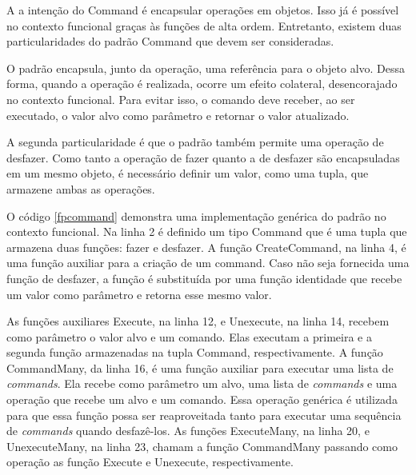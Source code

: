 A a intenção do Command é encapsular operações 
em objetos. Isso já é possível no contexto 
funcional graças às funções de alta ordem. 
Entretanto, existem duas particularidades 
do padrão Command que devem ser consideradas. 

O padrão encapsula, junto da operação, uma 
referência para o objeto alvo. Dessa forma, 
quando a operação é realizada, ocorre 
um efeito colateral, desencorajado 
no contexto funcional. Para evitar isso, o 
comando deve receber, ao ser executado, o 
valor alvo como parâmetro e retornar o 
valor atualizado.

A segunda particularidade é que o padrão 
também permite uma operação de desfazer. Como 
tanto a operação de fazer quanto a de desfazer 
são encapsuladas em um mesmo objeto, é necessário 
definir um valor, como uma tupla, que armazene ambas 
as operações.

O código \ref{fpcommand} demonstra uma implementação 
genérica do padrão no contexto funcional. Na linha 2 
é definido um tipo Command que é uma tupla que 
armazena duas funções: fazer e desfazer. A função 
CreateCommand, na linha 4, é uma função auxiliar para 
a criação de um command. Caso não seja fornecida 
uma função de desfazer, a função é substituída por 
uma função identidade que recebe um valor como 
parâmetro e retorna esse mesmo valor.

As funções auxiliares Execute, na linha 12, e 
Unexecute, na linha 14, recebem como parâmetro o valor 
alvo e um comando. Elas executam a primeira e a 
segunda função armazenadas na tupla Command, 
respectivamente. A função CommandMany, da linha 16, 
é uma função auxiliar 
para executar uma lista de \textit{commands}. Ela recebe 
como parâmetro um alvo, uma lista de \textit{commands} e 
uma operação que recebe um alvo e um comando. Essa 
operação genérica é utilizada para que essa função 
possa ser reaproveitada tanto para executar uma 
sequência de \textit{commands} quando desfazê-los. 
As funções ExecuteMany, na linha 20, e UnexecuteMany, 
na linha 23, chamam a função CommandMany passando 
como operação as função Execute e Unexecute, 
respectivamente.


